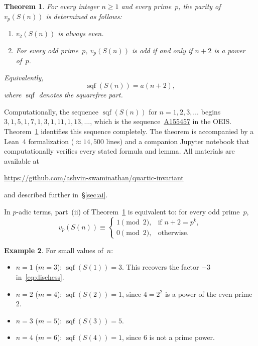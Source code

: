 \documentclass[10pt]{amsart}
\newtheorem{theorem}{Theorem}[section]
\theoremstyle{definition}
\newtheorem{example}[theorem]{Example}
\theoremstyle{remark}
\DeclareMathOperator{\sqf}{sqf}
\begin{document}
\begin{theorem}\label{thm:main}
For every integer $n \ge 1$ and every prime~$p$, the parity
of~$v_p(S(n))$ is determined as follows:
\begin{enumerate}[label=\textup{(\roman*)}]
\item $v_2(S(n))$ is always even.
\item For every odd prime~$p$, $v_p(S(n))$ is odd if and only
if $n+2$ is a power of~$p$.
\end{enumerate}
Equivalently,
\[
\sqf(S(n)) = a(n+2),
\]
where $\sqf$ denotes the squarefree part.
\end{theorem}

Computationally, the sequence $\sqf(S(n))$ for $n = 1, 2, 3, \dots$ begins
$3, 1, 5, 1, 7, 1, 3, 1, 11, 1, 13, \dots$,
which is the sequence~\href{https://oeis.org/A155457}{A155457}
in the OEIS.  Theorem~\ref{thm:main} identifies this sequence completely.
The theorem is accompanied by a Lean~4 formalization ($\approx 14{,}500$ lines)
and a companion Jupyter notebook that computationally verifies every stated
formula and lemma.  All materials are available at
\begin{center}
\url{https://github.com/ashvin-swaminathan/quartic-invariant}
\end{center}
and described further in~\S\ref{sec:ai}.

In $p$-adic terms, part~(ii) of Theorem~\ref{thm:main} is equivalent to:
for every odd prime~$p$,
\begin{equation}\label{eq:vp-parity}
v_p(S(n)) \equiv \begin{cases}
1 \pmod{2}, & \text{if } n+2 = p^k,\\
0 \pmod{2}, & \text{otherwise.}
\end{cases}
\end{equation}
\begin{example}
For small values of~$n$:
\begin{itemize}
\item $n=1$ ($m=3$): $\sqf(S(1))=3$. This recovers the factor $-3$
  in~\eqref{eq:dischess}.
\item $n=2$ ($m=4$): $\sqf(S(2))=1$, since $4=2^2$ is a power of the
  even prime~$2$.
\item $n=3$ ($m=5$): $\sqf(S(3))=5$.
\item $n=4$ ($m=6$): $\sqf(S(4))=1$, since $6$ is not a prime power.
\end{itemize}
\end{example}
\end{document}
